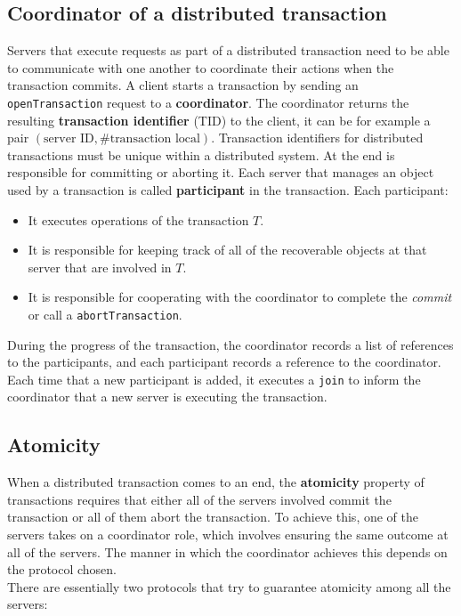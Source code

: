 \subsection{Coordinator of a distributed transaction}
Servers that execute requests as part of a distributed transaction need to be able to communicate with one another to coordinate their actions when the transaction commits. A client starts a transaction by sending an \verb|openTransaction| request to a \textbf{coordinator}. The coordinator returns the resulting \textbf{transaction identifier} (TID) to the client, it can be for example a pair $(\text{server ID}, \#\text{transaction local})$. Transaction identifiers for distributed transactions must be unique within a distributed system. At the end is responsible for committing or aborting it. 
Each server that manages an object used by a transaction is called \textbf{participant} in the transaction. Each participant:
\begin{itemize}
	\item It executes operations of the transaction $T$.
	\item It is responsible for keeping track of all of the recoverable objects at that server that are involved in $T$.
	\item It is responsible for cooperating with the coordinator to complete the \textit{commit} or call a \verb|abortTransaction|.
\end{itemize}
During the progress of the transaction, the coordinator records a list of references to the participants, and each participant records a reference to the coordinator. Each time that a new participant is added, it executes a \verb|join| to inform the coordinator that a new server is executing the transaction.


\subsection{Atomicity}
When a distributed transaction comes to an end, the \textbf{atomicity} property of transactions requires that either all of the servers involved commit the transaction or all of them abort the transaction. To achieve this, one of the servers takes on a coordinator role, which involves ensuring the same outcome at all of the servers. The manner in which the coordinator achieves this depends on the protocol chosen. \\

There are essentially two protocols that try to guarantee atomicity among all the servers:

